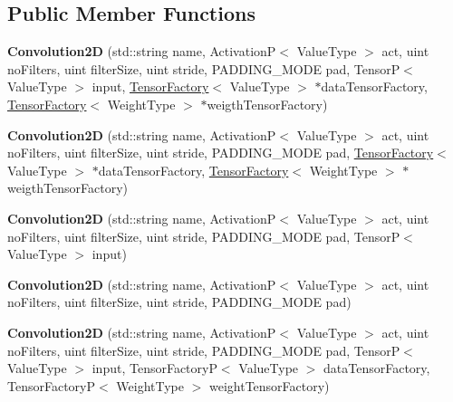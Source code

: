 \subsection*{Public Member Functions}
\begin{DoxyCompactItemize}
\item 
\mbox{\label{classConvolution2D_ad8c19607c1be356df2aca05117e33b96}} 
{\bfseries Convolution2D} (std\+::string name, ActivationP$<$ Value\+Type $>$ act, uint no\+Filters, uint filter\+Size, uint stride, P\+A\+D\+D\+I\+N\+G\+\_\+\+M\+O\+DE pad, TensorP$<$ Value\+Type $>$ input, \hyperlink{classTensorFactory}{Tensor\+Factory}$<$ Value\+Type $>$ $\ast$data\+Tensor\+Factory, \hyperlink{classTensorFactory}{Tensor\+Factory}$<$ Weight\+Type $>$ $\ast$weigth\+Tensor\+Factory)
\item 
\mbox{\label{classConvolution2D_a54909b2da5a3fa4436d42a4d40135649}} 
{\bfseries Convolution2D} (std\+::string name, ActivationP$<$ Value\+Type $>$ act, uint no\+Filters, uint filter\+Size, uint stride, P\+A\+D\+D\+I\+N\+G\+\_\+\+M\+O\+DE pad, \hyperlink{classTensorFactory}{Tensor\+Factory}$<$ Value\+Type $>$ $\ast$data\+Tensor\+Factory, \hyperlink{classTensorFactory}{Tensor\+Factory}$<$ Weight\+Type $>$ $\ast$weigth\+Tensor\+Factory)
\item 
\mbox{\label{classConvolution2D_af9bd71d1356e708f9872d48279f6713a}} 
{\bfseries Convolution2D} (std\+::string name, ActivationP$<$ Value\+Type $>$ act, uint no\+Filters, uint filter\+Size, uint stride, P\+A\+D\+D\+I\+N\+G\+\_\+\+M\+O\+DE pad, TensorP$<$ Value\+Type $>$ input)
\item 
\mbox{\label{classConvolution2D_a3ac1b953a9fb5eb2f48faf0229933531}} 
{\bfseries Convolution2D} (std\+::string name, ActivationP$<$ Value\+Type $>$ act, uint no\+Filters, uint filter\+Size, uint stride, P\+A\+D\+D\+I\+N\+G\+\_\+\+M\+O\+DE pad)
\item 
\mbox{\label{classConvolution2D_af69229ab131e71abc743057699edfb42}} 
{\bfseries Convolution2D} (std\+::string name, ActivationP$<$ Value\+Type $>$ act, uint no\+Filters, uint filter\+Size, uint stride, P\+A\+D\+D\+I\+N\+G\+\_\+\+M\+O\+DE pad, TensorP$<$ Value\+Type $>$ input, Tensor\+FactoryP$<$ Value\+Type $>$ data\+Tensor\+Factory, Tensor\+FactoryP$<$ Weight\+Type $>$ weight\+Tensor\+Factory)

\end{DoxyCompactItemize}
